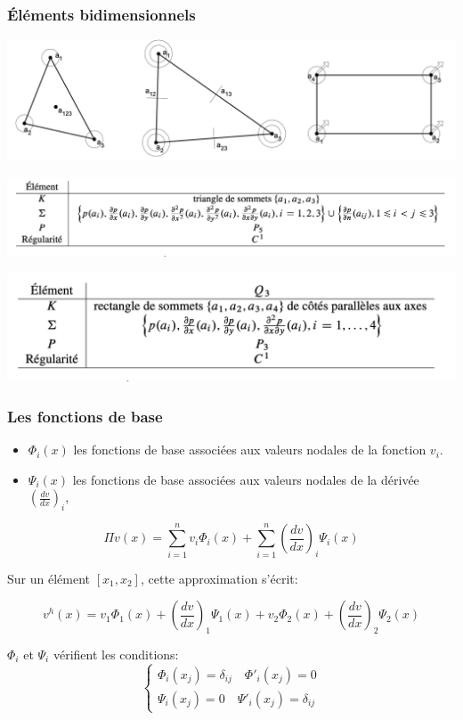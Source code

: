 \documentclass{beamer}
\begin{document}
\begin{frame}
\frametitle{Éléments bidimensionnels}
\begin{center}
\includegraphics[scale=0.2]{elementsHermite.png} 
\end{center}
\begin{center}
\includegraphics[scale=0.25]{hermiteBidim1.png} 
\end{center}
\begin{center}
\includegraphics[scale=0.25]{hermiteBidim2.png} 
\end{center}

\end{frame}



\begin{frame}
\frametitle{Les fonctions de base}

\begin{itemize}
\item $\Phi_{i}(x)$ les fonctions de base associées aux valeurs nodales de la fonction $v_{i}$.
\item $\Psi_{i}(x)$ les fonctions de base associées aux valeurs nodales de la dérivée $(\frac{dv}{dx})_{i}$,
\end{itemize}


\begin{displaymath}
\Pi v (x)=\sum_{i=1}^{n}v_{i}\Phi_{i}(x)+\sum_{i=1}^{n}(\frac{dv}{dx})_{i}\Psi_{i}(x)\end{displaymath}

Sur un élément $[x_{1},x_{2}]$, cette approximation s'écrit:

\begin{displaymath}
v^{h}(x)=v_{1}\Phi_{1}(x)+(\frac{dv}{dx})_{1}\Psi_{1}(x)+v_{2}\Phi_{2}(x)+(\frac{dv}{dx})_{2}\Psi_{2}(x)\end{displaymath}

$\Phi_{i}$ et $\Psi_i$ vérifient les conditions:
\[\left\{\begin{array}{l}
\Phi_{i}(x_j)=\delta_{ij}\quad \Phi'_{i}(x_j)=0\\
\Psi_{i}(x_j)=0\quad \Psi'_{i}(x_j)=\delta_{ij}
\end{array} \right. \]
\end{frame}
\end{document}
